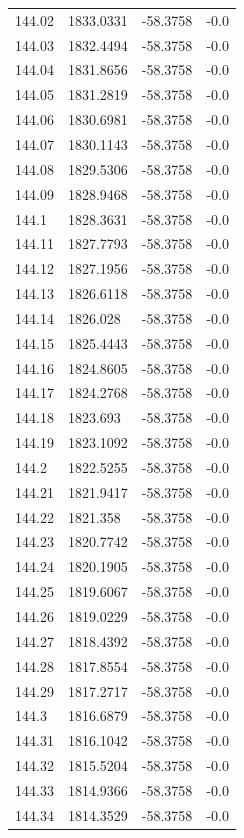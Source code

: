 \begin{table}[H]
\begin{tabular}{llll}
144.02 & 1833.0331 & -58.3758 & -0.0 \\
144.03 & 1832.4494 & -58.3758 & -0.0 \\
144.04 & 1831.8656 & -58.3758 & -0.0 \\
144.05 & 1831.2819 & -58.3758 & -0.0 \\
144.06 & 1830.6981 & -58.3758 & -0.0 \\
144.07 & 1830.1143 & -58.3758 & -0.0 \\
144.08 & 1829.5306 & -58.3758 & -0.0 \\
144.09 & 1828.9468 & -58.3758 & -0.0 \\
144.1 & 1828.3631 & -58.3758 & -0.0 \\
144.11 & 1827.7793 & -58.3758 & -0.0 \\
144.12 & 1827.1956 & -58.3758 & -0.0 \\
144.13 & 1826.6118 & -58.3758 & -0.0 \\
144.14 & 1826.028 & -58.3758 & -0.0 \\
144.15 & 1825.4443 & -58.3758 & -0.0 \\
144.16 & 1824.8605 & -58.3758 & -0.0 \\
144.17 & 1824.2768 & -58.3758 & -0.0 \\
144.18 & 1823.693 & -58.3758 & -0.0 \\
144.19 & 1823.1092 & -58.3758 & -0.0 \\
144.2 & 1822.5255 & -58.3758 & -0.0 \\
144.21 & 1821.9417 & -58.3758 & -0.0 \\
144.22 & 1821.358 & -58.3758 & -0.0 \\
144.23 & 1820.7742 & -58.3758 & -0.0 \\
144.24 & 1820.1905 & -58.3758 & -0.0 \\
144.25 & 1819.6067 & -58.3758 & -0.0 \\
144.26 & 1819.0229 & -58.3758 & -0.0 \\
144.27 & 1818.4392 & -58.3758 & -0.0 \\
144.28 & 1817.8554 & -58.3758 & -0.0 \\
144.29 & 1817.2717 & -58.3758 & -0.0 \\
144.3 & 1816.6879 & -58.3758 & -0.0 \\
144.31 & 1816.1042 & -58.3758 & -0.0 \\
144.32 & 1815.5204 & -58.3758 & -0.0 \\
144.33 & 1814.9366 & -58.3758 & -0.0 \\
144.34 & 1814.3529 & -58.3758 & -0.0 \\

\end{tabular}
\end{table}
